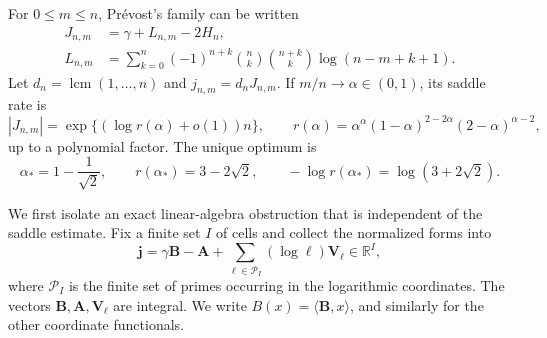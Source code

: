 \documentclass[11pt]{article}
\theoremstyle{definition}
\theoremstyle{remark}
\newcommand{\R}{\mathbb R}
\newcommand{\lcm}{\operatorname{lcm}}
\begin{document}
For \(0\le m\le n\), Pr\'evost's family \cite{Prevost2008} can be written
\begin{align}
 J_{n,m}&=\gamma+L_{n,m}-2H_n,\label{eq:prevost-form}\\
 L_{n,m}&=\sum_{k=0}^n(-1)^{n+k}
 \binom nk\binom{n+k}k\log(n-m+k+1).
 \label{eq:prevost-log}
\end{align}
Let \(d_n=\lcm(1,\ldots,n)\) and \(j_{n,m}=d_nJ_{n,m}\).  If
\(m/n\to\alpha\in(0,1)\), its saddle rate is
\begin{equation}\label{eq:prevost-rate}
 |J_{n,m}|=\exp\{(\log r(\alpha)+o(1))n\},
 \qquad
 r(\alpha)=
 \alpha^\alpha(1-\alpha)^{2-2\alpha}(2-\alpha)^{\alpha-2},
\end{equation}
up to a polynomial factor.  The unique optimum is
\begin{equation}\label{eq:prevost-optimum}
 \alpha_*=1-\frac1{\sqrt2},
 \qquad
 r(\alpha_*)=3-2\sqrt2,
 \qquad
 -\log r(\alpha_*)=\log(3+2\sqrt2).
\end{equation}

We first isolate an exact linear-algebra obstruction that is independent of
the saddle estimate.  Fix a finite set \(I\) of cells and collect the
normalized forms into
\begin{equation}\label{eq:prevost-vector}
 \mathbf j=\gamma\mathbf B-\mathbf A
 +\sum_{\ell\in\mathcal P_I}(\log\ell)\mathbf V_\ell\in\R^I,
\end{equation}
where \(\mathcal P_I\) is the finite set of primes occurring in the
logarithmic coordinates.  The vectors \(\mathbf B,\mathbf A,\mathbf V_\ell\)
are integral.  We write \(B(x)=\langle\mathbf B,x\rangle\), and similarly
for the other coordinate functionals.
\end{document}

